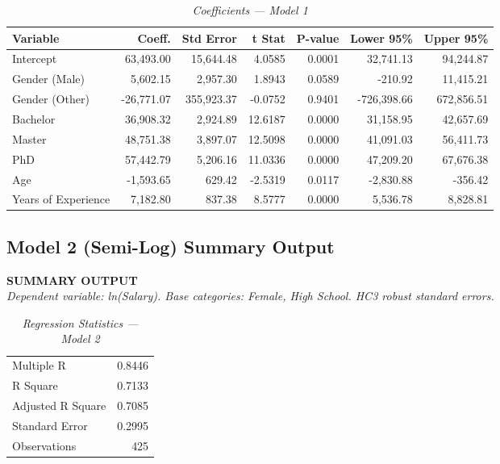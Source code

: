 \documentclass[12pt, a4paper]{article}
\begin{document}
\begin{table}[H]
\centering\scriptsize
\caption*{\textit{Coefficients — Model 1}}
\begin{tabular}{lrrrrrr}
\toprule
\textbf{Variable} & \textbf{Coeff.} & \textbf{Std Error} & \textbf{t Stat} & \textbf{P-value} & \textbf{Lower 95\%} & \textbf{Upper 95\%} \\
\midrule
Intercept          & 63,493.00 & 15,644.48 & 4.0585 & 0.0001 & 32,741.13 & 94,244.87 \\
Gender (Male)      &  5,602.15 &  2,957.30 & 1.8943 & 0.0589 &   -210.92 & 11,415.21 \\
Gender (Other)     & -26,771.07 & 355,923.37 & -0.0752 & 0.9401 & -726,398.66 & 672,856.51 \\
Bachelor           & 36,908.32 &  2,924.89 & 12.6187 & 0.0000 & 31,158.95 & 42,657.69 \\
Master             & 48,751.38 &  3,897.07 & 12.5098 & 0.0000 & 41,091.03 & 56,411.73 \\
PhD                & 57,442.79 &  5,206.16 & 11.0336 & 0.0000 & 47,209.20 & 67,676.38 \\
Age                & -1,593.65 &    629.42 & -2.5319 & 0.0117 & -2,830.88 &   -356.42 \\
Years of Experience &  7,182.80 &    837.38 &  8.5777 & 0.0000 &  5,536.78 &  8,828.81 \\
\bottomrule
\end{tabular}
\end{table}

\subsection{Model 2 (Semi-Log) Summary Output}

\noindent\textbf{SUMMARY OUTPUT}\\[0.4em]
\textit{Dependent variable: ln(Salary). Base categories: Female, High School. HC3 robust standard errors.}

\begin{table}[H]
\centering\scriptsize
\caption*{\textit{Regression Statistics — Model 2}}
\begin{tabular}{lr}
\toprule
Multiple R & 0.8446 \\
R Square & 0.7133 \\
Adjusted R Square & 0.7085 \\
Standard Error & 0.2995 \\
Observations & 425 \\
\bottomrule
\end{tabular}
\end{table}
\end{document}
